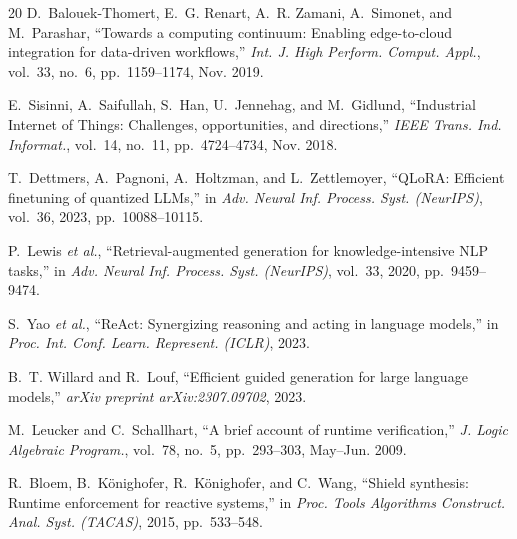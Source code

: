 \documentclass{ieeeaccess}
\begin{document}
\begin{thebibliography}{20}
D.~Balouek-Thomert, E.~G. Renart, A.~R. Zamani, A.~Simonet, and M.~Parashar, ``Towards a computing continuum: Enabling edge-to-cloud integration for data-driven workflows,'' \emph{Int. J. High Perform. Comput. Appl.}, vol.~33, no.~6, pp.~1159--1174, Nov. 2019.

E.~Sisinni, A.~Saifullah, S.~Han, U.~Jennehag, and M.~Gidlund, ``Industrial Internet of Things: Challenges, opportunities, and directions,'' \emph{IEEE Trans. Ind. Informat.}, vol.~14, no.~11, pp.~4724--4734, Nov. 2018.

T.~Dettmers, A.~Pagnoni, A.~Holtzman, and L.~Zettlemoyer, ``QLoRA: Efficient finetuning of quantized LLMs,'' in \emph{Adv. Neural Inf. Process. Syst. (NeurIPS)}, vol.~36, 2023, pp.~10088--10115.

P.~Lewis \emph{et al.}, ``Retrieval-augmented generation for knowledge-intensive NLP tasks,'' in \emph{Adv. Neural Inf. Process. Syst. (NeurIPS)}, vol.~33, 2020, pp.~9459--9474.

S.~Yao \emph{et al.}, ``ReAct: Synergizing reasoning and acting in language models,'' in \emph{Proc. Int. Conf. Learn. Represent. (ICLR)}, 2023.

B.~T. Willard and R.~Louf, ``Efficient guided generation for large language models,'' \emph{arXiv preprint arXiv:2307.09702}, 2023.

M.~Leucker and C.~Schallhart, ``A brief account of runtime verification,'' \emph{J. Logic Algebraic Program.}, vol.~78, no.~5, pp.~293--303, May--Jun. 2009.

R.~Bloem, B.~K{\"o}nighofer, R.~K{\"o}nighofer, and C.~Wang, ``Shield synthesis: Runtime enforcement for reactive systems,'' in \emph{Proc. Tools Algorithms Construct. Anal. Syst. (TACAS)}, 2015, pp.~533--548.

\end{thebibliography}
\end{document}
